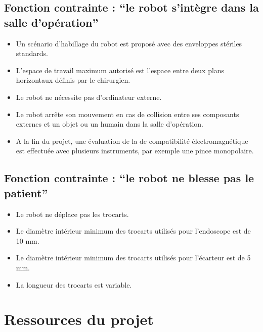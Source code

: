 \documentclass[oneside, DIV=11]{scrreprt}
\begin{document}
\section{Fonction contrainte : “le robot s'intègre dans la salle d'opération”}
\begin{itemize}
    \item Un scénario d'habillage du robot est proposé avec des enveloppes stériles standards.
    \item L'espace de travail maximum autorisé est l'espace entre deux plans horizontaux définis par le chirurgien.
    \item Le robot ne nécessite pas d'ordinateur externe.
    \item Le robot arrête son mouvement en cas de collision entre ses composants externes et un objet ou un humain dans la salle d'opération.
    \item A la fin du projet, une évaluation de la de compatibilité électromagnétique est effectuée avec plusieurs instruments, par exemple une pince monopolaire.

\end{itemize}

\section{Fonction contrainte : “le robot ne blesse pas le patient”}
\begin{itemize}
 \item Le robot ne déplace pas les trocarts.
 \item Le diamètre intérieur minimum des trocarts utilisés pour l'endoscope est de 10 mm.
 \item Le diamètre intérieur minimum des trocarts utilisés pour l'écarteur est de 5 mm.
 \item La longueur des trocarts est variable.

\end{itemize}



\chapter{Ressources du projet}
\end{document}
